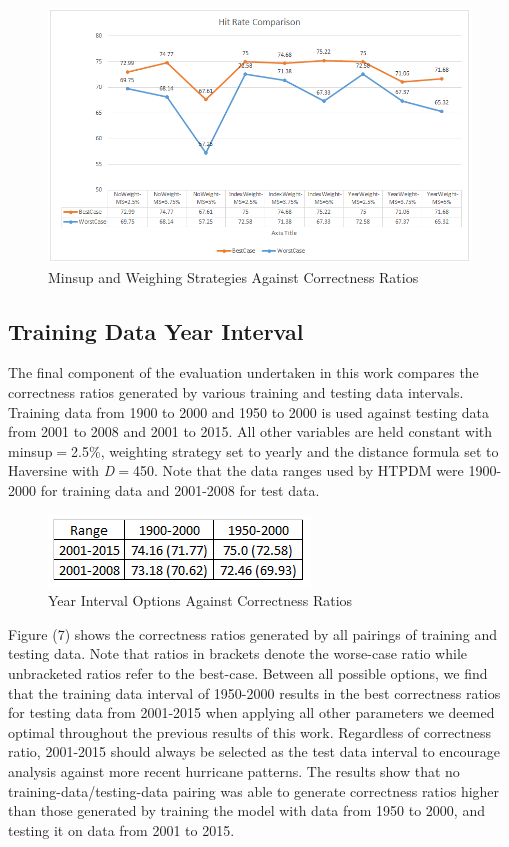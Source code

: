 \documentclass[12pt,conference]{IEEEtran}
\begin{document}
\begin{figure}[!tp]
\centering
\includegraphics[scale=0.8]{Hit-Rate-Weight-Metrics}
\caption{Minsup and Weighing Strategies Against Correctness Ratios}
\end{figure}

\subsection{Training Data Year Interval}

The final component of the evaluation undertaken in this work compares the correctness ratios generated by various training and testing data intervals. Training data from 1900 to 2000 and 1950 to 2000 is used against testing data from 2001 to 2008 and 2001 to 2015. All other variables are held constant with minsup$=$2.5\%, weighting strategy set to yearly and the distance formula set to Haversine with \textit{D}$=$450. Note that the data ranges used by HTPDM were 1900-2000 for training data and 2001-2008 for test data.

\begin{figure}[htp]
\centering
\includegraphics[scale=1.0]{Year-Interval-Metrics}
\caption{Year Interval Options Against Correctness Ratios}
\end{figure}

Figure (7) shows the correctness ratios generated by all pairings of training and testing data. Note that ratios in brackets denote the worse-case ratio while unbracketed ratios refer to the best-case. Between all possible options, we find that the training data interval of 1950-2000 results in the best correctness ratios for testing data from 2001-2015 when applying all other parameters we deemed optimal throughout the previous results of this work. Regardless of correctness ratio, 2001-2015 should always be selected as the test data interval to encourage analysis against more recent hurricane patterns. The results show that no training-data/testing-data pairing was able to generate correctness ratios higher than those generated by training the model with data from 1950 to 2000, and testing it on data from 2001 to 2015.
\end{document}
